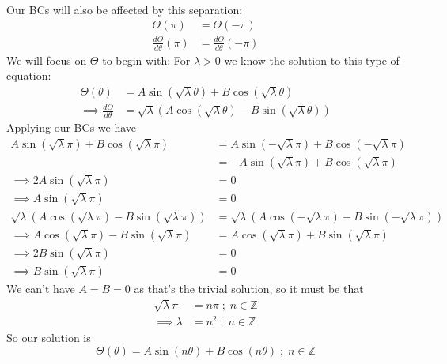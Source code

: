 \documentclass[12pt]{article}
\begin{document}
\begin{enumerate}
\begin{align*}
        \end{align*}
        Our BCs will also be affected by this separation:
        \begin{align*}
            \Theta(\pi)&=\Theta(-\pi)\\
            \frac{d\Theta}{d\theta}(\pi)&=\frac{d\Theta}{d\theta}(-\pi)
        \end{align*}
        We will focus on $\Theta$ to begin with:\newline
        For $\lambda>0$ we know the solution to this type of equation:
        \begin{align*}
            \Theta(\theta)&=A\sin(\sqrt{\lambda}\theta)+B\cos(\sqrt{\lambda}\theta)\\
            \implies \frac{d\Theta}{d\theta}&=\sqrt{\lambda}(A\cos(\sqrt{\lambda}\theta)-B\sin(\sqrt{\lambda}\theta))
        \end{align*}
        Applying our BCs we have 
        \begin{align*}
            A\sin(\sqrt{\lambda}\pi)+B\cos(\sqrt{\lambda}\pi)&=A\sin(-\sqrt{\lambda}\pi)+B\cos(-\sqrt{\lambda}\pi)\\
            &=-A\sin(\sqrt{\lambda}\pi)+B\cos(\sqrt{\lambda}\pi)\\
            \implies 2A\sin(\sqrt{\lambda}\pi)&=0\\
            \implies A\sin(\sqrt{\lambda}\pi)&=0\\
            \sqrt{\lambda}(A\cos(\sqrt{\lambda}\pi)-B\sin(\sqrt{\lambda}\pi))&=\sqrt{\lambda}(A\cos(-\sqrt{\lambda}\pi)-B\sin(-\sqrt{\lambda}\pi))\\
            \implies A\cos(\sqrt{\lambda}\pi)-B\sin(\sqrt{\lambda}\pi)&=A\cos(\sqrt{\lambda}\pi)+B\sin(\sqrt{\lambda}\pi)\\
            \implies 2B\sin(\sqrt{\lambda}\pi)&=0\\
            \implies B\sin(\sqrt{\lambda}\pi)&=0
        \end{align*}
        We can't have $A=B=0$ as that's the trivial solution, so it must be that 
        \begin{align*}
            \sqrt{\lambda}\pi&=n\pi\;;\;n\in\mathbb{Z}\\
            \implies \lambda&=n^2\;;\;n\in\mathbb{Z}
        \end{align*}
        So our solution is
        \begin{equation*}
            \Theta(\theta)=A\sin(n\theta)+B\cos(n\theta)\;;\;n\in\mathbb{Z}
        \end{equation*}

\end{enumerate}
\end{document}
